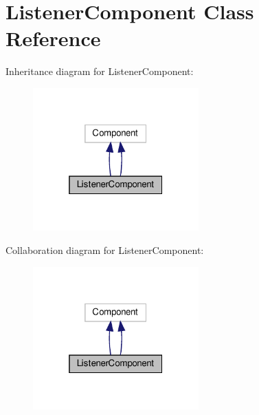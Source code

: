 \hypertarget{classListenerComponent}{}\section{Listener\+Component Class Reference}
\label{classListenerComponent}


Inheritance diagram for Listener\+Component\+:
\nopagebreak
\begin{figure}[H]
\begin{center}
\leavevmode
\includegraphics[width=181pt]{classListenerComponent__inherit__graph}
\end{center}
\end{figure}


Collaboration diagram for Listener\+Component\+:
\nopagebreak
\begin{figure}[H]
\begin{center}
\leavevmode
\includegraphics[width=181pt]{classListenerComponent__coll__graph}
\end{center}
\end{figure}
